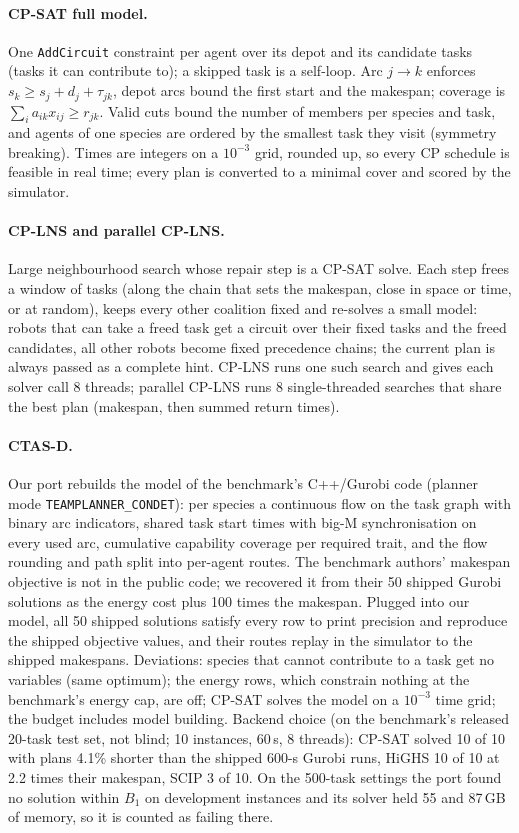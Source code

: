 \documentclass[10pt]{article}
\begin{document}
\paragraph{CP-SAT full model.} One \texttt{AddCircuit} constraint per agent over its depot and its candidate tasks (tasks it
can contribute to); a skipped task is a self-loop. Arc $j \to k$ enforces $s_k \ge s_j + d_j + \tau_{jk}$, depot arcs
bound the first start and the makespan; coverage is $\sum_i a_{ik} x_{ij} \ge r_{jk}$. Valid cuts bound the number of
members per species and task, and agents of one species are ordered by the smallest task they visit (symmetry
breaking). Times are integers on a $10^{-3}$ grid, rounded up, so every CP schedule is feasible in real time; every
plan is converted to a minimal cover and scored by the simulator.

\paragraph{CP-LNS and parallel CP-LNS.} Large neighbourhood search whose repair step is a CP-SAT solve. Each step
frees a window of tasks (along the chain that sets the makespan, close in space or time, or at random), keeps every
other coalition fixed and re-solves a small model: robots that can take a freed task get a circuit over their fixed
tasks and the freed candidates, all other robots become fixed precedence chains; the current plan is always passed as
a complete hint. CP-LNS runs one such search and gives each solver call 8 threads; parallel CP-LNS runs 8
single-threaded searches that share the best plan (makespan, then summed return times).

\paragraph{CTAS-D.} Our port rebuilds the model of the benchmark's C++/Gurobi code (planner mode
\texttt{TEAMPLANNER\_\allowbreak CONDET}): per species a continuous flow on the task graph with binary arc indicators, shared task
start times with big-M synchronisation on every used arc, cumulative capability coverage per required trait, and the
flow rounding and path split into per-agent routes. The benchmark authors' makespan objective is not in the public
code; we recovered it from their 50 shipped Gurobi solutions as the energy cost plus 100 times the makespan. Plugged
into our model, all 50 shipped solutions satisfy every row to print precision and reproduce the shipped objective
values, and their routes replay in the simulator to the shipped makespans. Deviations: species that cannot contribute
to a task get no variables (same optimum); the energy rows, which constrain nothing at the benchmark's energy cap, are
off; CP-SAT solves the model on a $10^{-3}$ time grid; the budget includes model building. Backend choice (on the
benchmark's released 20-task test set, not blind; 10 instances, 60\,s, 8 threads): CP-SAT solved 10 of 10 with plans
4.1\% shorter than the shipped 600-s Gurobi runs, HiGHS 10 of 10 at 2.2 times their makespan, SCIP 3 of 10. On the
500-task settings the port found no solution within $B_1$ on development instances and its solver held 55 and 87\,GB of memory, so it is
counted as failing there.
\end{document}
